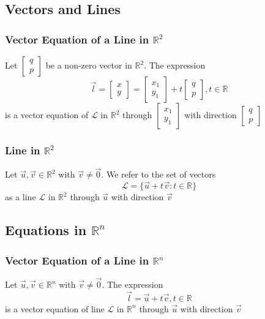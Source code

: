 \documentclass[12pt, letterpaper]{article}
\begin{document}
\subsection{Vectors and Lines}
\subsubsection{Vector Equation of a Line in $\mathbb{R}^2$}
Let $\begin{bmatrix} q \\ p \end{bmatrix}$ be a non-zero vector in $\mathbb{R}^2$. The expression 
\[\vec{l} = \begin{bmatrix} x \\ y \end{bmatrix} = \begin{bmatrix} x_1 \\ y_1 \end{bmatrix} + t\begin{bmatrix} q \\ p \end{bmatrix}, t\in\mathbb{R}\]
is a vector equation of $\mathcal{L}$ in $\mathbb{R}^2$ through $\begin{bmatrix} x_1 \\ y_1 \end{bmatrix}$ with 
direction $\begin{bmatrix} q \\ p \end{bmatrix}$
\subsubsection{Line in $\mathbb{R}^2$}
Let $\vec{u}, \vec{v}\in\mathbb{R}^2$ with $\vec{v}\neq\vec{0}$. We refer to the set of vectors 
\[\mathcal{L} = \{\vec{u} + t\vec{v} : t\in\mathbb{R}\}\]
as a line $\mathcal{L}$ in $\mathbb{R}^2$ through $\vec{u}$ with direction $\vec{v}$
\subsection{Equations in $\mathbb{R}^n$}
\subsubsection{Vector Equation of a Line in $\mathbb{R}^n$}
Let $\vec{u}, \vec{v}\in\mathbb{R}^n$ with $\vec{v}\neq\vec{0}$. The expression 
\[\vec{l} = \vec{u}+t\vec{v}, t\in\mathbb{R}\]
is a vector equation of line $\mathcal{L}$ in $\mathbb{R}^n$ through $\vec{u}$ with direction $\vec{v}$
\end{document}
